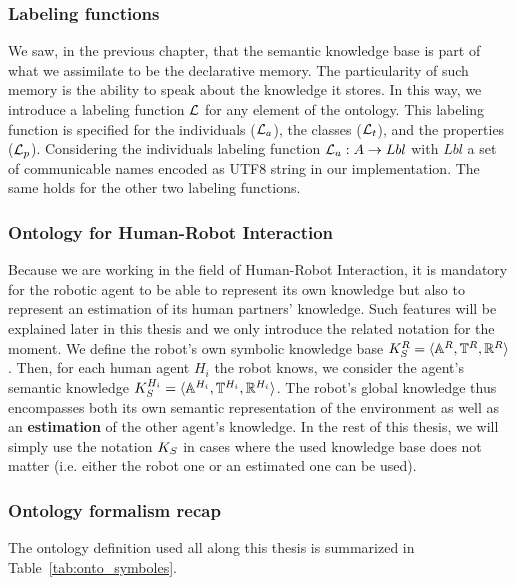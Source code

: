 \subsubsection{Labeling functions}

We saw, in the previous chapter, that the semantic knowledge base is part of what we assimilate to be the declarative memory. The particularity of such memory is the ability to speak about the knowledge it stores. In this way, we introduce a labeling function $\mathcal{L}$ for any element of the ontology. This labeling function is specified for the individuals ($\mathcal{L}_a$), the classes ($\mathcal{L}_t$), and the properties ($\mathcal{L}_p$). Considering the individuals labeling function $\mathcal{L}_a: A \rightarrow Lbl$ with $Lbl$ a set of communicable names encoded as UTF8 string in our implementation. The same holds for the other two labeling functions.

\subsubsection{Ontology for Human-Robot Interaction}

Because we are working in the field of Human-Robot Interaction, it is mandatory for the robotic agent to be able to represent its own knowledge but also to represent an estimation of its human partners' knowledge. Such features will be explained later in this thesis and we only introduce the related notation for the moment.
We define the robot's own symbolic knowledge base $K_S^R = \langle \mathbb{A}^R, \mathbb{T}^R, \mathbb{R}^R\rangle$.
Then, for each human agent $H_i$ the robot knows, we consider the agent's semantic knowledge $K_S^{H_i} = \langle \mathbb{A}^{H_i}, \mathbb{T}^{H_i}, \mathbb{R}^{H_i} \rangle$.
The robot's global knowledge thus encompasses both its own semantic representation of the environment as well as an \textbf{estimation} of the other agent's knowledge.
In the rest of this thesis, we will simply use the notation $K_S$ in cases where the used knowledge base does not matter (i.e. either the robot one or an estimated one can be used).

\subsubsection{Ontology formalism recap}

The ontology definition used all along this thesis is summarized in Table~\ref{tab:onto_symboles}.


